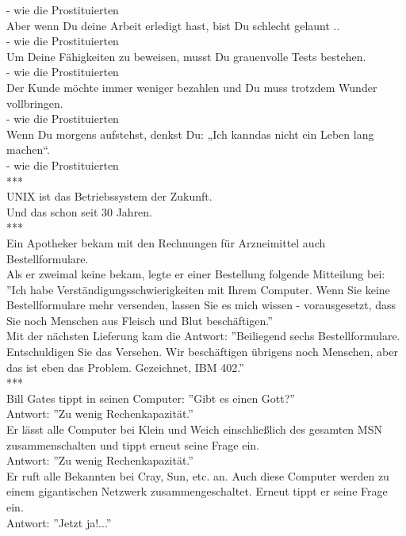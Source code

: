 - wie die Prostituierten \\
\newline
Aber wenn Du deine Arbeit erledigt hast, bist Du schlecht gelaunt .. \\
- wie die Prostituierten \\
\newline
Um Deine Fähigkeiten zu beweisen, musst Du grauenvolle Tests bestehen. \\
- wie die Prostituierten \\
\newline
Der Kunde möchte immer weniger bezahlen und Du muss trotzdem Wunder vollbringen. \\
- wie die Prostituierten \\
\newline
Wenn Du morgens aufstehst, denkst Du: „Ich kanndas nicht ein Leben lang machen“. \\
- wie die Prostituierten\\


***\\


UNIX ist das Betriebssystem der Zukunft. \\
Und das schon seit 30 Jahren.\\


***\\


Ein Apotheker bekam mit den Rechnungen für Arzneimittel auch Bestellformulare.\\
\newline
Als er zweimal keine bekam, legte er einer Bestellung folgende Mitteilung bei:\\
''Ich habe Verständigungsschwierigkeiten mit Ihrem Computer. Wenn Sie keine Bestellformulare mehr versenden, lassen Sie es mich wissen - vorausgesetzt, dass Sie noch Menschen aus Fleisch und Blut beschäftigen.''\\
\newline
Mit der nächsten Lieferung kam die Antwort: ''Beiliegend sechs Bestellformulare. Entschuldigen Sie das Versehen. Wir beschäftigen übrigens noch Menschen, aber das ist eben das Problem. Gezeichnet, IBM 402.''\\


***\\


Bill Gates tippt in seinen Computer: ''Gibt es einen Gott?''\\
Antwort: ''Zu wenig Rechenkapazität.''\\
\newline
Er lässt alle Computer bei Klein und Weich einschließlich des gesamten MSN zusammenschalten und tippt erneut seine Frage ein.\\
Antwort: ''Zu wenig Rechenkapazität.''\\
\newline
Er ruft alle Bekannten bei Cray, Sun, etc. an. Auch diese Computer werden zu einem gigantischen Netzwerk zusammengeschaltet. Erneut tippt er seine Frage ein.\\
Antwort: ''Jetzt ja!...''\\


